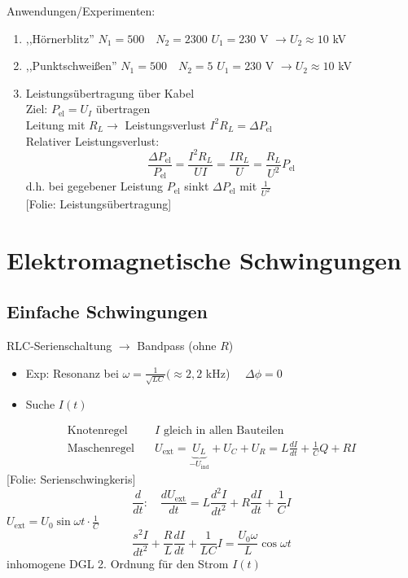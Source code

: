 \documentclass[titlepage,12pt,a4paper,ngerman]{report}
\newcommand{\tx}[1]{\textrm{#1}}
\newcommand{\uind}{U_{\tx{ind}}}
\newcommand{\folie}[1]{\color{gray}[Folie: #1]\color{black}}
\begin{document}
Anwendungen/Experimenten:
\begin{enumerate}[1.]
	\item ,,Hörnerblitz'' $N_1 = 500 \quad N_2 = 2300$
	$U_1 = 230$ V $\rightarrow U_2 \approx 10$ kV
	\item ,,Punktschweißen''  $N_1 = 500 \quad N_2 = 5$
	$U_1 = 230$ V $\rightarrow U_2 \approx 10$ kV
	\item Leistungsübertragung über Kabel\\
		Ziel: $P_{\tx{el}} = U_I$ übertragen\\
		Leitung mit $R_L \rightarrow$ Leistungsverlust $I^2 R_L = \Delta P_{\tx{el}}$\\
		Relativer Leistungsverlust:
		$$\frac{\Delta P_{\tx{el}}}{P_{\tx{el}}} = \frac{I^2 R_L}{UI} = \frac{IR_L}{U}= \frac{R_L}{U^2} P_{\tx{el}}$$
		d.h. bei gegebener Leistung $P_{\tx{el}}$ sinkt $\Delta P_{\tx{el}}$ mit $\frac{1}{U^2}$\\
		\folie{Leistungsübertragung}\\

\end{enumerate}

\section{Elektromagnetische Schwingungen}
\subsection{Einfache Schwingungen}
RLC-Serienschaltung $\rightarrow$ Bandpass (ohne $R$)
\begin{itemize}
	\item Exp: Resonanz bei $\omega = \frac{1}{\sqrt{LC}} (\approx 2,2$ kHz) $\quad \Delta\phi = 0$
	\item Suche $I(t)$
\end{itemize}
\begin{align*}
 	\tx{Knotenregel}& \quad I \tx{ gleich in allen Bauteilen}\\
 	\tx{Maschenregel}& \quad U_{\tx{ext}} = \underbrace{U_L}_{-\uind} + U_C + U_R = L \frac{dI}{dt}+ \frac{1}{C}Q + R I
\end{align*}
\folie{Serienschwingkeris}
$$ \frac{d}{dt}: \quad \frac{d U_{\tx{ext}}}{dt} = L \frac{d^2 I}{dt^2} + R \frac{dI}{dt} + \frac{1}{C} I $$
$ U_{\tx{ext}} = U_0 \sin \omega t \cdot \frac{1}{C} $
$$\frac{s^2 I}{dt^2} + \frac{R}{L} \frac{dI}{dt} + \frac{1}{LC} I = \frac{U_0 \omega}{L} \cos \omega t $$
inhomogene DGL 2. Ordnung für den Strom $ I(t) $\\
\end{document}
